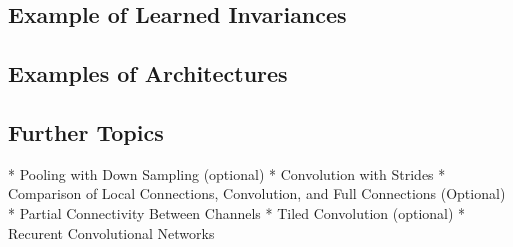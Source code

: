 \documentclass[]{article}
\begin{document}

\subsection{Example of Learned Invariances}


\subsection{Examples of Architectures}

\subsection{Further Topics}
* Pooling with Down Sampling (optional)
* Convolution with Strides
* Comparison of Local Connections, Convolution, and Full Connections (Optional)
* Partial Connectivity Between Channels
* Tiled Convolution (optional)
* Recurent Convolutional Networks





\end{document}
